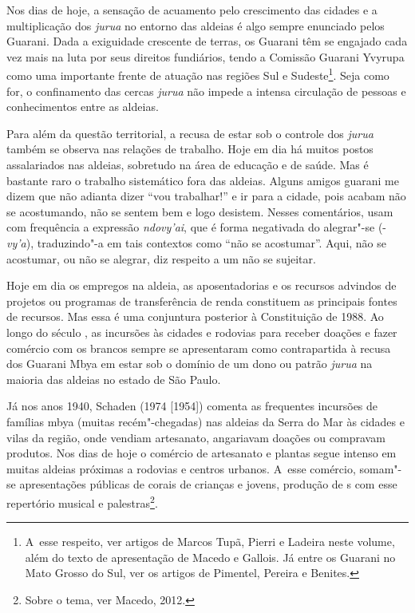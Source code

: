 Nos dias de hoje, a sensação de acuamento pelo crescimento das cidades e
a multiplicação dos \emph{jurua} no entorno das aldeias é algo sempre
enunciado pelos Guarani. Dada a exiguidade crescente de terras, os
Guarani têm se engajado cada vez mais na luta por seus direitos
fundiários, tendo a Comissão Guarani Yvyrupa como uma importante frente
de atuação nas regiões Sul e Sudeste\footnote{A~esse respeito, ver
artigos de Marcos Tupã, Pierri e Ladeira neste volume, além do texto de
apresentação de Macedo e Gallois. Já entre os Guarani no Mato Grosso do
Sul, ver os artigos de Pimentel, Pereira e Benites.}. Seja como for, o
confinamento das cercas \emph{jurua} não impede a intensa circulação de
pessoas e conhecimentos entre as aldeias. 

Para além da questão territorial, a recusa de estar sob o controle dos
\emph{jurua} também se observa nas relações de trabalho. Hoje em dia há muitos
postos assalariados nas aldeias, sobretudo na área de educação e de
saúde. Mas é bastante raro o trabalho sistemático fora das aldeias.
Alguns amigos guarani me dizem que não adianta dizer ``vou trabalhar!'' e
ir para a cidade, pois acabam não se acostumando, não se sentem bem e
logo desistem. Nesses comentários, usam com frequência a expressão
\emph{ndovy’ai}, que é forma negativada do alegrar"-se (-\emph{vy'a}), traduzindo"-a em
tais contextos como ``não se acostumar''. Aqui, não se acostumar, ou não
se alegrar, diz respeito a um não se sujeitar.

Hoje em dia os empregos na aldeia, as aposentadorias e os recursos
advindos de projetos ou programas de transferência de renda constituem
as principais fontes de recursos. Mas essa é uma conjuntura posterior à
Constituição de 1988. Ao longo do século , as incursões às cidades e
rodovias para receber doações e fazer comércio com os brancos sempre se
apresentaram como contrapartida à recusa dos Guarani Mbya em estar sob
o domínio de um dono ou patrão \emph{jurua} na maioria das aldeias no estado
de São Paulo. 

Já nos anos 1940, Schaden (1974 [1954]) comenta as frequentes incursões
de famílias mbya (muitas recém"-chegadas) nas aldeias da Serra do Mar às
cidades e vilas da região, onde vendiam artesanato, angariavam doações
ou compravam produtos. Nos dias de hoje o comércio de artesanato e
plantas segue intenso em muitas aldeias próximas a rodovias e centros
urbanos. A~esse comércio, somam"-se apresentações públicas de corais de
crianças e jovens, produção de s com esse repertório musical e
palestras\footnote{Sobre o tema, ver Macedo, 2012.}. 


